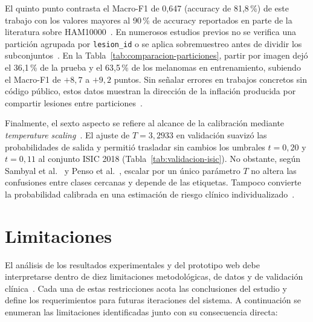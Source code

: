 El quinto punto contrasta el Macro-F1 de 0,647 (accuracy de 81,8\,\%) de este trabajo con los valores mayores al 90\,\% de accuracy reportados en parte de la literatura sobre HAM10000~\cite{hu2024multiscale}. En numerosos estudios previos no se verifica una partición agrupada por \texttt{lesion\_id} o se aplica sobremuestreo antes de dividir los subconjuntos~\cite{abhishek2025quality,kapoor2023leakage}. En la Tabla~\ref{tab:comparacion-particiones}, partir por imagen dejó el 36,1\,\% de la prueba y el 63,5\,\% de los melanomas en entrenamiento, subiendo el Macro-F1 de $+8{,}7$ a $+9{,}2$ puntos. Sin señalar errores en trabajos concretos sin código público, estos datos muestran la dirección de la inflación producida por compartir lesiones entre particiones~\cite{kapoor2023leakage,abhishek2025quality}.

Finalmente, el sexto aspecto se refiere al alcance de la calibración mediante \textit{temperature scaling}~\cite{guo2017calibration,sambyal2023calibration}. El ajuste de $T = 3{,}2933$ en validación suavizó las probabilidades de salida y permitió trasladar sin cambios los umbrales $t = 0{,}20$ y $t = 0{,}11$ al conjunto ISIC 2018 (Tabla~\ref{tab:validacion-isic}). No obstante, según Sambyal et al.~\cite{sambyal2023calibration} y Penso et al.~\cite{penso2024calibration}, escalar por un único parámetro $T$ no altera las confusiones entre clases cercanas y depende de las etiquetas. Tampoco convierte la probabilidad calibrada en una estimación de riesgo clínico individualizado~\cite{sambyal2023calibration,penso2024calibration}.

\section{Limitaciones}

El análisis de los resultados experimentales y del prototipo web debe interpretarse dentro de diez limitaciones metodológicas, de datos y de validación clínica~\cite{collins2024tripodai,vasey2022decideai}. Cada una de estas restricciones acota las conclusiones del estudio y define los requerimientos para futuras iteraciones del sistema. A continuación se enumeran las limitaciones identificadas junto con su consecuencia directa:

